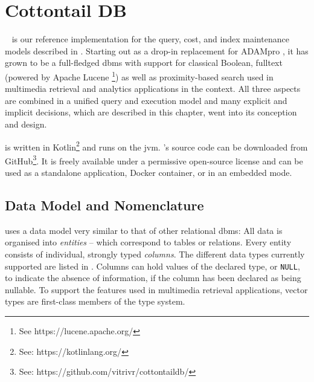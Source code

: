 \chapter{Cottontail DB}

\label{chapter:cottontaildb}

\cottontail{}~\cite{Gasser:2020Cottontail} is our reference implementation for the query, cost, and index maintenance models described in . Starting out as a drop-in replacement for ADAMpro \cite{Giangreco:2016Adam}, it has grown to be a full-fledged \acrshort{dbms} with support for classical Boolean, fulltext (powered by Apache Lucene \footnote{See https://lucene.apache.org/}) as well as proximity-based search used in multimedia retrieval and analytics applications in the \vitrivr{} \cite{Rossetto:2016Vitrivr,Gasser:2019Multimodal} context. All three aspects are combined in a unified query and execution model and many explicit and implicit decisions, which are described in this chapter, went into its conception and design.

\cottontail{} is written in Kotlin\footnote{See: https://kotlinlang.org/} and runs on the \acrfull{jvm}. \cottontail{}'s source code can be downloaded from GitHub\footnote{See: https://github.com/vitrivr/cottontaildb/}. It is freely available under a permissive open-source license and can be used as a standalone application, Docker container, or in an embedded mode.

\section{Data Model and Nomenclature} 

\cottontail{} uses a data model very similar to that of other relational \acrshort{dbms}: All data is organised into \emph{entities} -- which correspond to tables or relations. Every entity consists of individual, strongly typed \emph{columns}. The different data types currently supported are listed in . Columns can hold values of the declared type, or \texttt{NULL}, to indicate the absence of information, if the column has been declared as being nullable. To support the features used in multimedia retrieval applications, vector types are first-class members of the type system.

